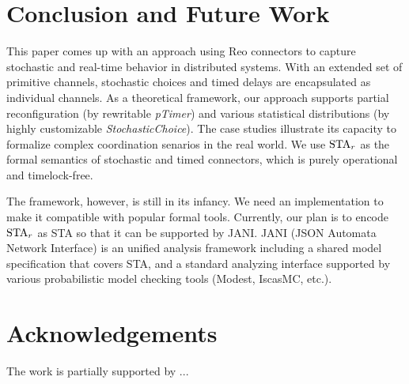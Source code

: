 \section{Conclusion and Future Work}
\label{sec:conclusion}

This paper comes up with an approach using Reo connectors to capture stochastic and real-time behavior in distributed systems. With an extended set of primitive channels, stochastic choices and timed delays are encapsulated as individual channels. As a theoretical framework, our approach supports partial reconfiguration (by rewritable \emph{pTimer}) and various statistical distributions (by highly customizable \emph{StochasticChoice}). The case studies illustrate its capacity to formalize complex coordination senarios in the real world. We use $\mbox{STA}_r$ as the formal semantics of stochastic and timed connectors, which is purely operational and timelock-free.

The framework, however, is still in its infancy. We need an implementation to make it compatible with popular formal tools. Currently, our plan is to encode $\mbox{STA}_r$ as STA so that it can be supported by JANI. JANI (JSON Automata Network Interface) \cite{JaniSpec} is an unified analysis framework including a shared model specification that covers STA, and a standard analyzing interface supported by various probabilistic model checking tools (Modest\cite{Hartmanns12}, IscasMC\cite{HahnYiFM14}, etc.).


\section*{Acknowledgements}
The work is partially supported by ...
